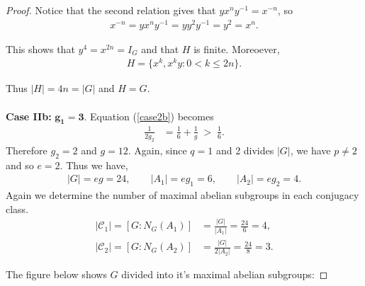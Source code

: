\begin{proof}
Notice that the second relation gives that $y x^n y^{-1} = x^{-n}$, so
\begin{align*} x^{-n} = y x^n y^{-1} = y y^2 y^{-1} = y^2 = x^n.
\end{align*}

This shows that $y^4 = x^{2n} = I_G$ and that $H$ is finite. Moreoever,
\begin{align*} H = \{ x^k, x^ky :  0 < k \leq 2n \}.
\end{align*}

 Thus $|H| = 4n = |G|$ and $H = G$. \\
\\
 \space \textbf{Case IIb:} $\pmb{g_1 = 3}$.  Equation (\ref{case2b}) becomes
\begin{align*} \frac{1}{2g_2} &= \frac{1}{6} + \frac{1}{g} \; > \; \frac{1}{6}.
\end{align*}
Therefore $g_2 = 2$ and $g = 12$. Again, since $q=1$ and 2 divides $|G|$, we have $p \neq 2$ and so $e = 2$. Thus we have,
\begin{align*} |G| = eg = 24, \qquad |A_1| = eg_1 = 6, \qquad |A_2| = eg_2 = 4.
\end{align*}
Again we determine the number of maximal abelian subgroups in each conjugacy class.
\begin{align*}  |\mathcal{C}_1| = [G:N_G(A_1)] &= \frac{|G|}{|A_1|} = \frac{24}{6} = 4, 
\\[1.5ex] |\mathcal{C}_2| = [G:N_G(A_2)] &= \frac{|G|}{2|A_2|} = \frac{24}{8} = 3.
\end{align*}

The figure below shows $G$ divided into it's maximal abelian subgroups:







\end{proof}
